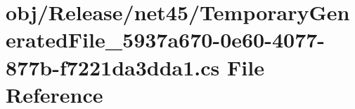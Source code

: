 \hypertarget{_release_2net45_2_temporary_generated_file__5937a670-0e60-4077-877b-f7221da3dda1_8cs}{}\section{obj/\+Release/net45/\+Temporary\+Generated\+File\+\_\+5937a670-\/0e60-\/4077-\/877b-\/f7221da3dda1.cs File Reference}
\label{_release_2net45_2_temporary_generated_file__5937a670-0e60-4077-877b-f7221da3dda1_8cs}
